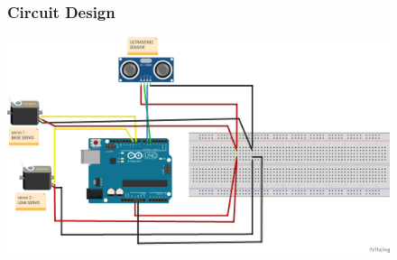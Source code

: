 \documentclass{beamer}
\begin{document}










\begin{frame}
\begin{figure}
\frametitle{Circuit Design}
\includegraphics[scale=0.4]{pin.png}
\end{figure}
\end{frame}
\end{document}

